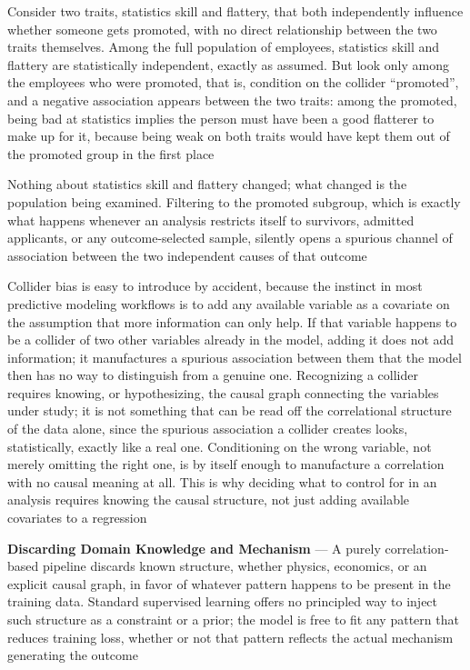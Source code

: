 Consider two traits, statistics skill and flattery, that both independently
influence whether someone gets promoted, with no direct relationship between the
two traits themselves. Among the full population of employees, statistics skill and
flattery are statistically independent, exactly as assumed. But look only among the
employees who were promoted, that is, condition on the collider ``promoted'',
and a negative association appears between the two traits: among the promoted,
being bad at statistics implies the person must have been a good flatterer to
make up for it, because being weak on both traits would have kept them out of the
promoted group in the first place

Nothing about statistics skill and flattery changed; what changed is the population
being examined. Filtering to the promoted subgroup, which is exactly what happens
whenever an analysis restricts itself to survivors, admitted applicants, or any outcome-selected
sample, silently opens a spurious channel of association between the two
independent causes of that outcome

Collider bias is easy to introduce by accident, because the instinct in most
predictive modeling workflows is to add any available variable as a covariate on
the assumption that more information can only help. If that variable happens to be
a collider of two other variables already in the model, adding it does not add
information; it manufactures a spurious association between them that the model then
has no way to distinguish from a genuine one. Recognizing a collider requires
knowing, or hypothesizing, the causal graph connecting the variables under study;
it is not something that can be read off the correlational structure of the data
alone, since the spurious association a collider creates looks, statistically,
exactly like a real one. Conditioning on the wrong variable, not merely omitting
the right one, is by itself enough to manufacture a correlation with no causal meaning
at all. This is why deciding what to control for in an analysis requires knowing
the causal structure, not just adding available covariates to a regression

\textbf{Discarding Domain Knowledge and Mechanism} --- A purely correlation-based
pipeline discards known structure, whether physics, economics, or an explicit
causal graph, in favor of whatever pattern happens to be present in the training
data. Standard supervised learning offers no principled way to inject such
structure as a constraint or a prior; the model is free to fit any pattern that reduces
training loss, whether or not that pattern reflects the actual mechanism
generating the outcome

